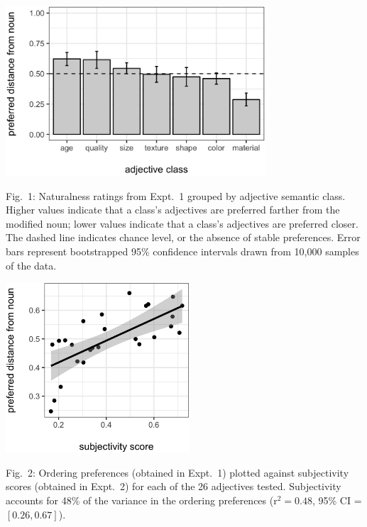 \documentclass[10pt]{article}
\begin{document}
\noindent\begin{minipage}[t]{.56\textwidth}
	\begin{center}
		\includegraphics[height=2.5in]{../../experiments/3-order-preference-both/results/LSA-class-distance.eps}
		\end{center}
	\vspace{-10pt}
	Fig.~1: Naturalness ratings from Expt.~1 grouped by adjective semantic class. Higher values indicate that a class's adjectives are preferred farther from the modified noun; lower values indicate that a class's adjectives are preferred closer. The dashed line indicates chance level, or the absence of stable preferences. Error bars represent bootstrapped 95\% confidence intervals drawn from 10,000 samples of the data.
	\end{minipage}
\hspace{10pt}
\begin{minipage}[t]{.4\textwidth}
	\begin{center}
		\includegraphics[height=2.5in]{../../experiments/4-faultless-disagreement/results/LSA-naturalness-subjectivity.eps}
		\end{center}
	\vspace{-10pt}
	Fig.~2: Ordering preferences (obtained in Expt.~1) plotted against subjectivity scores (obtained in Expt.~2) for each of the 26 adjectives tested. Subjectivity accounts for 48\% of the variance in the ordering preferences (r$^2 = 0.48$, 95\% CI = $[0.26,0.67]$).
\end{minipage}
\end{document}
